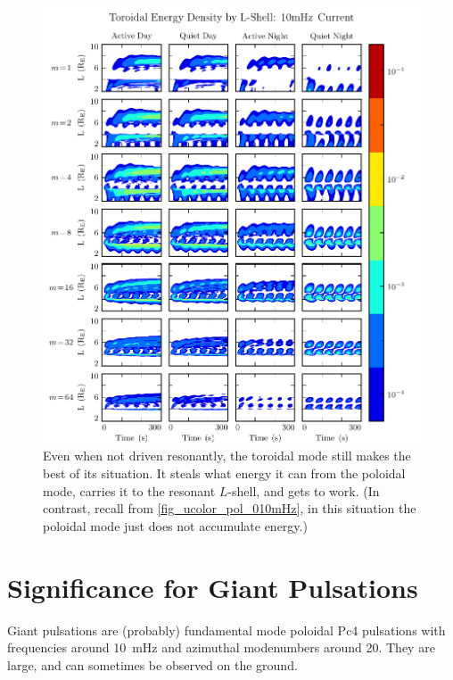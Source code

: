 \begin{figure}[H]
    \centering
    \includegraphics[width=\textwidth]{figures/ucolor_tor_010mHz.pdf}
    \caption[Toroidal Energy Density by L-Shell: 10mHz]{
      Even when not driven resonantly, the toroidal mode still makes the best of its situation. It steals what energy it can from the poloidal mode, carries it to the resonant $L$-shell, and gets to work. (In contrast, recall from \cref{fig_ucolor_pol_010mHz}, in this situation the poloidal mode just does not accumulate energy.)
    }
    \label{fig_ucolor_tor_010mHz}
\end{figure}

\section{Significance for Giant Pulsations}

Giant pulsations are (probably\cite{takahashi_2011}) fundamental mode poloidal Pc4 pulsations with frequencies around \SI{10}{\mHz} and azimuthal modenumbers around \num{20}. They are large, and can sometimes be observed on the ground. 

